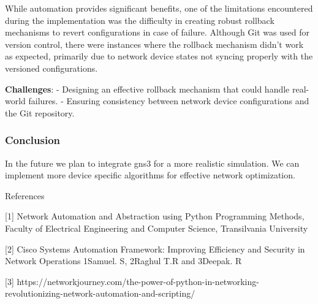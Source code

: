 \documentclass[11pt]{article}
\begin{document}
While automation provides significant benefits, one of the limitations
encountered during the implementation was the difficulty in creating
robust rollback mechanisms to revert configurations in case of failure.
Although Git was used for version control, there were instances where
the rollback mechanism didn't work as expected, primarily due to network
device states not syncing properly with the versioned configurations.

\textbf{Challenges}: - Designing an effective rollback mechanism that
could handle real-world failures. - Ensuring consistency between network
device configurations and the Git repository.

\hypertarget{conclusion}{%
\subsubsection{Conclusion}\label{conclusion}}

In the future we plan to integrate gns3 for a more realistic simulation.
We can implement more device specific algorithms for effective network
optimization.

    References

    

    {[}1{]} Network Automation and Abstraction using Python Programming
Methods, Faculty of Electrical Engineering and Computer Science,
Transilvania University

{[}2{]} Cisco Systems Automation Framework: Improving Efficiency and
Security in Network Operations 1Samuel. S, 2Raghul T.R and 3Deepak. R

{[}3{]}
https://networkjourney.com/the-power-of-python-in-networking-revolutionizing-network-automation-and-scripting/

    


    
    
    
\end{document}

